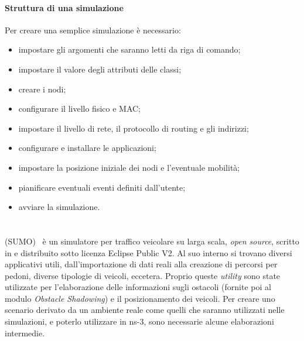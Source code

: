 \paragraph{Struttura di una simulazione}
Per creare una semplice simulazione è necessario:
\begin{itemize}
	\item impostare gli argomenti che saranno letti da riga di comando;
	\item impostare il valore degli attributi delle classi;
	\item creare i nodi;
	\item configurare il livello fisico e MAC;
	\item impostare il livello di rete, il protocollo di routing e gli indirizzi;
	\item configurare e installare le applicazioni;
	\item impostare la posizione iniziale dei nodi e l'eventuale mobilità;
	\item pianificare eventuali eventi definiti dall'utente;
	\item avviare la simulazione.
\end{itemize}
%
\section{\SUMO}\label{sec:sumo}
\SUMO{} (SUMO)~\cite{SUMO2012} è un simulatore per traffico veicolare su larga scala, \textit{open source}, scritto in \Cpp
e distribuito sotto licenza Eclipse Public V2.
Al suo interno si trovano diversi applicativi utili, dall'importazione di dati reali alla creazione di percorsi
per pedoni, diverse tipologie di veicoli, eccetera.
Proprio queste \textit{utility} sono state utilizzate per l'elaborazione delle informazioni sugli ostacoli (fornite poi
al modulo \textit{Obstacle Shadowing}) e il posizionamento dei veicoli.
%
Per creare uno scenario derivato da un ambiente reale come quelli che saranno utilizzati nelle simulazioni,
e poterlo utilizzare in ns-3, sono necessarie alcune elaborazioni intermedie.

